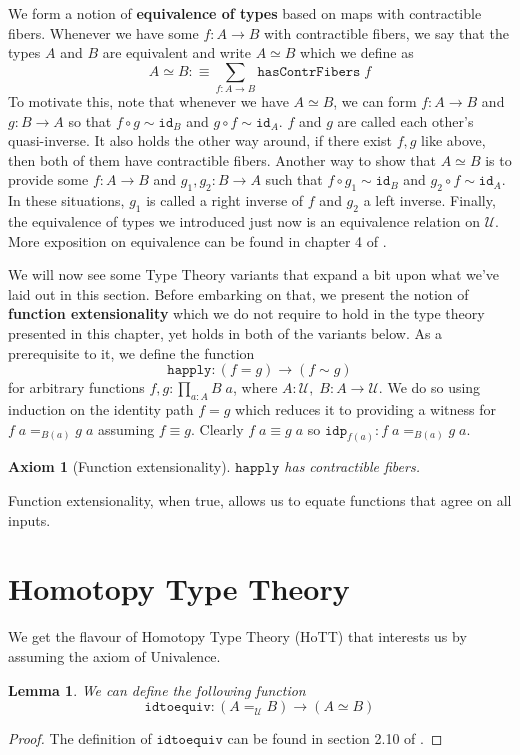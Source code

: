 \documentclass[12pt]{report}
\newtheorem{lem}[thm]{Lemma}
\newtheorem{axiom}[thm]{Axiom}
\begin{document}
 	We form a notion of \textbf{equivalence of types} based on maps with contractible fibers. 
 	Whenever we have some $f : A\rightarrow B$ with contractible fibers, we say that the types $A$ and $B$ are equivalent and write $A \simeq B$ which we define as 
 	$$A\simeq B :\equiv \sum_{f : A \rightarrow B}\mathtt{hasContrFibers}\;f$$ 
 	To motivate this, note that whenever we have $A\simeq B$, we can form $f : A\rightarrow B$ and $g : B \rightarrow A$ so that $f\circ g \sim \mathtt{id}_B$ and $g\circ f \sim \mathtt{id}_A$. 
 	$f$ and $g$ are called each other's quasi-inverse.
 	It also holds the other way around, if there exist $f,g$ like above, then both of them have contractible fibers. 
 	Another way to show that $A\simeq B$ is to provide some $f : A\rightarrow B$ and $g_1,g_2 : B \rightarrow A$ such that $f \circ g_1 \sim \mathtt{id}_B$ and $g_2 \circ f \sim \mathtt{id}_A$. 
 	In these situations, $g_1$ is called a right inverse of $f$ and $g_2$ a left inverse. 
 	Finally, the equivalence of types we introduced just now is an equivalence relation on $\mathcal{U}$. 
 	More exposition on equivalence can be found in chapter 4 of \cite{hottbook}.

 	We will now see some Type Theory variants that expand a bit upon what we've laid out in this section. 
 	Before embarking on that, we present the notion of \textbf{function extensionality} which we do not require to hold in the type theory presented in this chapter, yet holds in both of the variants below. 
 	As a prerequisite to it, we define the function 
 	$$\mathtt{happly} : (f = g) \rightarrow (f \sim g)$$
 	for arbitrary functions $f,g : \prod_{a :A}B\;a$, where $A : \mathcal{U},\; B : A \rightarrow \mathcal{U}$. We do so using induction on the identity path $f = g$ which reduces it to providing a witness for $f\;a =_{B(a)} g\;a$ assuming $f \equiv g$. 
 	Clearly $f\;a \equiv g\;a$ so $\mathtt{idp}_{f(a)} : f\;a =_{B(a)} g\;a$. 
 	\begin{axiom}[Function extensionality] 
 	$\mathtt{happly}$ has contractible fibers. 
 	\end{axiom}
 	Function extensionality, when true, allows us to equate functions that agree on all inputs. 

\section{Homotopy Type Theory}
We get the flavour of Homotopy Type Theory (HoTT) that interests us by assuming the axiom of Univalence.
\begin{lem}
We can define the following function
$$\mathtt{idtoequiv} : (A=_\mathcal{U}B) \rightarrow (A\simeq B)$$
\end{lem}
\begin{proof}
The definition of $\mathtt{idtoequiv}$ can be found in section 2.10 of \cite{hottbook}. 
\end{proof}
\end{document}
